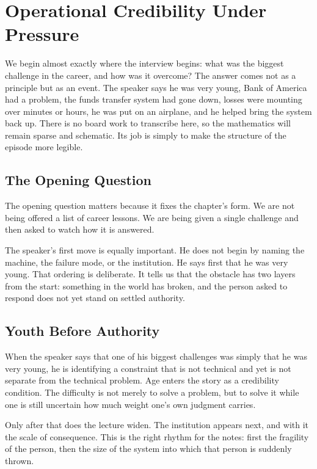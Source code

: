 \chapter{Operational Credibility Under Pressure}

We begin almost exactly where the interview begins: what was the biggest challenge in the career, and how was it overcome? The answer comes not as a principle but as an event. The speaker says he was very young, Bank of America had a problem, the funds transfer system had gone down, losses were mounting over minutes or hours, he was put on an airplane, and he helped bring the system back up. There is no board work to transcribe here, so the mathematics will remain sparse and schematic. Its job is simply to make the structure of the episode more legible.

\section{The Opening Question}

The opening question matters because it fixes the chapter's form. We are not being offered a list of career lessons. We are being given a single challenge and then asked to watch how it is answered.

The speaker's first move is equally important. He does not begin by naming the machine, the failure mode, or the institution. He says first that he was very young. That ordering is deliberate. It tells us that the obstacle has two layers from the start: something in the world has broken, and the person asked to respond does not yet stand on settled authority.

\section{Youth Before Authority}

When the speaker says that one of his biggest challenges was simply that he was very young, he is identifying a constraint that is not technical and yet is not separate from the technical problem. Age enters the story as a credibility condition. The difficulty is not merely to solve a problem, but to solve it while one is still uncertain how much weight one's own judgment carries.

Only after that does the lecture widen. The institution appears next, and with it the scale of consequence. This is the right rhythm for the notes: first the fragility of the person, then the size of the system into which that person is suddenly thrown.

